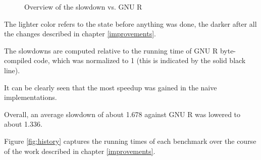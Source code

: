 \begin{figure}[htbp]
  \caption{\label{fig:overall}Overview of the slowdown vs. GNU R}
  \centering
\end{figure}

The lighter color refers to the state before anything was done, the darker after all the changes described in chapter \ref{improvements}.

The slowdowns are computed relative to the running time of GNU R byte-compiled code, which was normalized to 1 (this is indicated by the solid black line).

It can be clearly seen that the most speedup was gained in the naive implementations.

Overall, an average slowdown of about 1.678 against GNU R was lowered to about 1.336.

Figure \ref{fig:history} captures the running times of each benchmark over the course of the work described in chapter \ref{improvements}.

